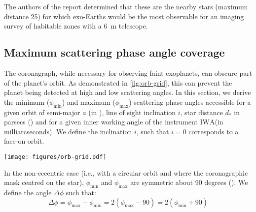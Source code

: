 \documentclass[
    usenatbib,
]{mnras}
\newcommand{\IWA}{\ensuremath{\mathrm{IWA}}}
\begin{document}
The authors of the report determined that these are the nearby stars (maximum distance \SI{25}{\parsec}) for which exo-Earths would be the most observable for an imaging survey of habitable zones with a \SI{6}{\meter} telescope.



\subsection{Maximum scattering phase angle coverage}
\label{sec:Delta_phi}

The coronagraph, while necessary for observing faint exoplanets, can obscure part of the planet's orbit. 
As demonstrated in \cref{fig:orb-grid}, this can prevent the planet being detected at high and low scattering angles. 
In this section, we derive the minimum ($\phi_\mathrm{min}$) and maximum ($\phi_\mathrm{max}$) scattering phase angles accessible for a given orbit of semi-major $a$ (in \si{\au}), line of sight inclination $i$, star distance $d_*$ in parsecs (\si{\parsec}) and for a given inner working angle of the instrument \IWA (in milliarcseconds). 
We define the inclination $i$, such that $i=0$ corresponds to a face-on orbit. 

\begin{figure*}%
   \centering
   \texttt{[image: figures/orb-grid.pdf]}
   \caption{
        The scattering phase angles accessible to a direct imaging mission can be limited by orbital inclination or by the coronagraphic inner working angle. 
        If the orbital inclination is close to face-on (top panels) then the scattering phase angles probed throughout an orbit are limited by inclination; for circular orbits accessible scattering phases are $\phi \in 90^\circ \pm i$. 
        For orbital inclinations close to edge-on (bottom panels) the planet goes through all phases, but the scattering phase angles near 0$^\circ$ and 180$^\circ$ are not accessible due to obscuration by the coronagraph mask; for circular orbits, the accessible scattering phases are $\phi \in 90^\circ \pm \arcsin({\rm IWA}\cdot d_*/a)$.
    }
    \label{fig:orb-grid}
\end{figure*}

In the non-eccentric case (i.e., with a circular orbit and where the coronagraphic mask centred on the star), $\phi_\mathrm{min}$ and $\phi_\mathrm{max}$ are symmetric about 90 degrees (). 
We define the angle $\Delta \phi$ such that: 
\begin{equation}
    \label{eq:Delta_phi}
    \Delta \phi 
    = \phi_\mathrm{max} - \phi_\mathrm{min}
    =  2(\phi_\mathrm{max} - 90) 
    =  2(\phi_\mathrm{min} + 90)
\end{equation}
\end{document}
